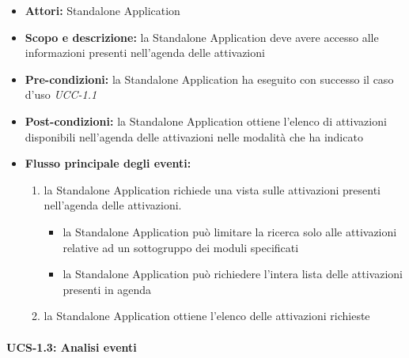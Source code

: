 \begin{itemize}
	\item \textbf{Attori:} Standalone Application
	\item \textbf{Scopo e descrizione:} la Standalone Application deve avere accesso alle informazioni presenti nell'agenda delle attivazioni
	\item \textbf{Pre-condizioni:} la Standalone Application ha eseguito con successo il caso d'uso \emph{UCC-1.1}
	\item \textbf{Post-condizioni:} la Standalone Application ottiene l'elenco di attivazioni disponibili nell'agenda delle attivazioni nelle modalità che ha indicato
	\item \textbf{Flusso principale degli eventi:}
		\begin{enumerate}
			\item la Standalone Application richiede una vista sulle attivazioni presenti nell'agenda delle attivazioni.
				\begin{itemize}
					\item la Standalone Application può limitare la ricerca solo alle attivazioni relative ad un sottogruppo dei moduli specificati
					\item la Standalone Application può richiedere l'intera lista delle attivazioni presenti in agenda
				\end{itemize}
			\item la Standalone Application ottiene l'elenco delle attivazioni richieste
		\end{enumerate}
\end{itemize}


\paragraph{UCS-1.3: Analisi eventi}

